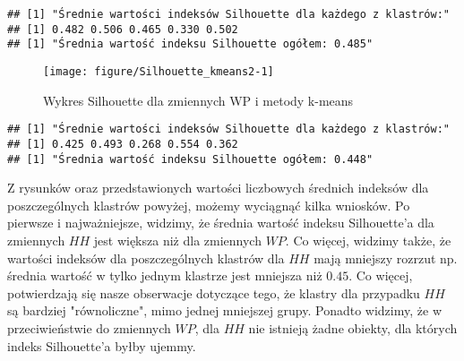 \documentclass[12pt, a4paper]{article}\usepackage[]{graphicx}\usepackage[]{xcolor}
\makeatletter
\def\maxwidth{ %
  \ifdim\Gin@nat@width>\linewidth
    \linewidth
  \else
    \Gin@nat@width
  \fi
}
\newenvironment{kframe}{%
 \def\at@end@of@kframe{}%
 \ifinner\ifhmode%
  \def\at@end@of@kframe{\end{minipage}}%
  \begin{minipage}{\columnwidth}%
 \fi\fi%
 \def\FrameCommand##1{\hskip\@totalleftmargin \hskip-\fboxsep
 \colorbox{shadecolor}{##1}\hskip-\fboxsep
     \hskip-\linewidth \hskip-\@totalleftmargin \hskip\columnwidth}%
 \MakeFramed {\advance\hsize-\width
   \@totalleftmargin\z@ \linewidth\hsize
   \@setminipage}}%
 {\par\unskip\endMakeFramed%
 \at@end@of@kframe}
\newenvironment{knitrout}{}{} %
\makeatother
\begin{document}
\begin{knitrout}
\color{fgcolor}\begin{kframe}
\begin{verbatim}
## [1] "Średnie wartości indeksów Silhouette dla każdego z klastrów:"
## [1] 0.482 0.506 0.465 0.330 0.502
## [1] "Średnia wartość indeksu Silhouette ogółem: 0.485"
\end{verbatim}
\end{kframe}
\end{knitrout}

\begin{knitrout}
\color{fgcolor}\begin{figure}[H]

{\centering \texttt{[image: figure/Silhouette\_kmeans2-1]} 

}

\caption[Wykres Silhouette dla zmiennych WP i metody k-means]{Wykres Silhouette dla zmiennych WP i metody k-means}\label{fig:Silhouette_kmeans2}
\end{figure}

\end{knitrout}

\begin{knitrout}
\color{fgcolor}\begin{kframe}
\begin{verbatim}
## [1] "Średnie wartości indeksów Silhouette dla każdego z klastrów:"
## [1] 0.425 0.493 0.268 0.554 0.362
## [1] "Średnia wartość indeksu Silhouette ogółem: 0.448"
\end{verbatim}
\end{kframe}
\end{knitrout}

Z rysunków oraz przedstawionych wartości liczbowych średnich indeksów dla poszczególnych klastrów powyżej, możemy wyciągnąć kilka wniosków. Po pierwsze i najważniejsze, widzimy, że średnia wartość indeksu Silhouette'a dla zmiennych $HH$ jest większa niż dla zmiennych $WP$. Co więcej, widzimy także, że wartości indeksów dla poszczególnych klastrów dla $HH$ mają mniejszy rozrzut np. średnia wartość w tylko jednym klastrze jest mniejsza niż $0.45$. Co więcej, potwierdzają się nasze obserwacje dotyczące tego, że klastry dla przypadku $HH$ są bardziej "równoliczne", mimo jednej mniejszej grupy. Ponadto widzimy, że w przeciwieństwie do zmiennych $WP$, dla $HH$ nie istnieją żadne obiekty, dla których indeks Silhouette'a byłby ujemmy. 
\end{document}
